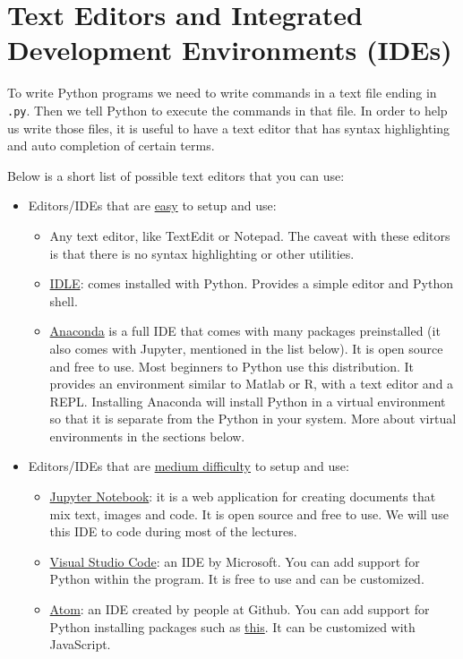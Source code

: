 \documentclass[12pt, a4paper]{article}
\begin{document}
\section*{Text Editors and Integrated Development Environments (IDEs)}
\label{sec:org51856e2}
To write Python programs we need to write commands in a text file ending in \texttt{.py}.
Then we tell Python to execute the commands in that file.
In order to help us write those files, it is useful to have a text editor that has syntax highlighting and auto completion of certain terms.

Below is a short list of possible text editors that you can use:
\begin{itemize}
\item Editors/IDEs that are \uline{easy} to setup and use:
\begin{itemize}
\item Any text editor, like TextEdit or Notepad. The caveat with these editors is that there is no syntax highlighting or other utilities.
\item \href{https://docs.python.org/3/library/idle.html}{IDLE}: comes installed with Python. Provides a simple editor and Python shell.
\item \href{https://www.anaconda.com/distribution/}{Anaconda} is a full IDE that comes with many packages preinstalled (it also comes with Jupyter, mentioned in the list below). It is open source and free to use. Most beginners to Python use this distribution. It provides an environment similar to Matlab or R, with a text editor and a REPL. Installing Anaconda will install Python in a virtual environment so that it is separate from the Python in your system. More about virtual environments in the sections below.
\end{itemize}
\item Editors/IDEs that are \uline{medium difficulty} to setup and use:
\begin{itemize}
\item \href{https://jupyter.org}{Jupyter Notebook}: it is a web application for creating documents that mix text, images and code. It is open source and free to use. We will use this IDE to code during most of the lectures.
\item \href{https://code.visualstudio.com}{Visual Studio Code}: an IDE by Microsoft. You can add support for Python within the program. It is free to use and can be customized.
\item \href{https://atom.io}{Atom}: an IDE created by people at Github. You can add support for Python installing packages such as \href{https://atom.io/packages/ide-python}{this}. It can be customized with JavaScript.

\end{itemize}
\end{itemize}
\end{document}
